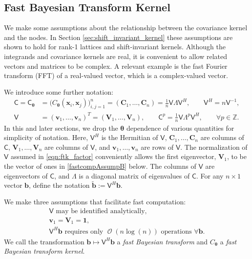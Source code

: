 \documentclass{svjour3}                     %
\DeclareMathOperator{\Order}{{\mathcal O}}
\newcommand{\bm}[1]{\boldsymbol{#1}}
\newcommand{\integers}{\mathbb{Z}}
\newcommand{\vtheta}{{\bm{\theta}}}
\newcommand{\vb}{\bm{b}}
\newcommand{\vC}{\bm{C}}
\newcommand{\vv}{\bm{v}}
\newcommand{\vV}{\bm{V}}
\newcommand{\vx}{\bm{x}}
\newcommand{\vone}{\bm{1}}
\newcommand{\mC}{\mathsf{C}}
\newcommand{\mLambda}{\mathsf{\Lambda}}
\newcommand{\mV}{\mathsf{V}}
\begin{document}
\subsection{Fast Bayesian Transform Kernel}
We make some assumptions about the relationship between the covariance kernel and the nodes.  In Section \ref{sec:shift_invariant_kernel} these assumptions are shown to hold  for rank-1 lattices and shift-invariant kernels.  Although the integrands and covariance kernels are real, it is convenient to allow related vectors and matrices to be complex.  A relevant example is the fast Fourier transform (FFT) of a real-valued vector, which is a complex-valued vector. 

We introduce some further notation:
\begin{align}
\mC = \mC_\vtheta &= \Big(C_\vtheta(\vx_i,\vx_j)\Big)_{i,j=1}^n  = (\vC_1,\dots,\vC_n) 
\label{eqn:ftk_factor}
= \frac 1n \mV \mLambda \mV^H , 
\quad \quad \mV^H = n \mV^{-1}, \\
\nonumber
\mV &= (\vv_1,\ldots,\vv_n)^T = (\vV_1,\ldots,\vV_n),
\qquad
\mC^p  = \frac 1n \mV \mLambda^{p} \mV^H, \qquad \forall p \in \integers.
\end{align}
In this and later sections, we drop the $\vtheta$ dependence of various quantities for simplicity of notation.  Here, $\mV^H$ is the Hermitian of $\mV$, $\vC_1,\dots,\vC_n$ are columns of $\mC$,  $\vV_1,\dots,\vV_n$ are columns of $\mV$, and $\vv_1,\dots,\vv_n$ are rows of $\mV$.  The normalization of $\mV$ assumed in \eqref{eqn:ftk_factor} conveniently allows the first eigenvector, $\vV_1$, to be the vector of ones in \eqref{fastcompAssumpB} below.  The columns of $\mV$ are eigenvectors of $\mC$, and $\mLambda$ is a diagonal matrix of eigenvalues of $\mC$.
For any $n \times 1$ vector $\vb$, define the notation  $\widetilde{\vb} := \mV^H \vb$.

We make three assumptions that facilitate  fast computation:
\begin{subequations} \label{fastcompAssump}
	\begin{gather}
	\label{fastcompAssumpA}
	\mV \text{ may be identified analytically}, \\
	\label{fastcompAssumpB}
	\vv_1 = \vV_1 = \vone, \\
	\label{fastcompAssumpC}
	\mV^H \vb  \text{ requires only $\Order(n \log(n))$ operations } \forall \vb.
	\end{gather}
\end{subequations}
We call the transformation $\vb \mapsto \mV^H \vb$ a \emph{fast Bayesian transform} and $C_\vtheta$ a \emph{fast Bayesian transform kernel}.  
\end{document}
